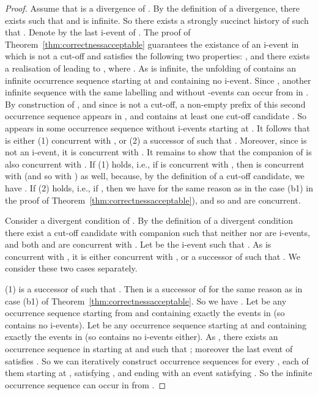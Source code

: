 \documentclass{llncs}
\begin{document}
\begin{proof}

Assume that  is a divergence of .
By the definition of a divergence, there exists  such that  and  is infinite.
So there exists a strongly succinct history  of  such that . Denote by  the last i-event of .
The proof of Theorem~\ref{thm:correctnessacceptable} guarantees the existance
of an i-event  in  which is not a cut-off and satisfies the following two properties: , and there exists a realisation of  leading to , where .
As  is infinite, the unfolding  of  contains an infinite occurrence sequence starting at  and containing no i-event. Since 
, another infinite sequence with the same labelling and without -events can occur from  in . By construction of , and since  is not a cut-off, a non-empty prefix of this second occurrence sequence appears in , and contains at least one cut-off candidate .
So  appears in some occurrence sequence without i-events starting at .
It follows that  is either (1) concurrent with , or 
(2) a successor of  such that . 
Moreover, since  is not an i-event, it is concurrent with .
It remains to show that the companion  of  is also concurrent with .
If (1) holds, i.e., if  is concurrent with , then  is concurrent with  (and so with ) as well, because, by the definition of a cut-off candidate, we have .
If (2) holds, i.e., if , then we have  for the same reason as in the case (b1) in the proof of Theorem~\ref{thm:correctnessacceptable}), and so  and  are concurrent.


Consider a divergent condition  of .
By the definition of a divergent condition there exist a cut-off candidate  with companion  such that neither  nor  are i-events, 
and both  and  are concurrent with .
Let  be the i-event such that .
As  is concurrent with , it is either concurrent with , or a successor of  such that . We consider these two cases separately.

(1)  is a successor of  such that .  Then  is a successor of  for the same reason as in case (b1) of Theorem~\ref{thm:correctnessacceptable}. So we have .
Let  be any occurrence sequence starting from  and containing exactly the events in  (so  contains no i-events).
Let  be any occurrence sequence starting at  and containing exactly the events in  (so  contains no i-events either).
As , there exists an occurrence sequence  
in  starting at  and such that ; moreover the last event  of  satisfies .
So we can iteratively construct occurrence sequences  for every , each of them starting at , satisfying , 
and ending with an event  satisfying .
So the infinite occurrence sequence  can occur in  from .


\end{proof}
\end{document}
